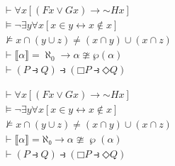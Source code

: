 \documentclass{article}
\begin{document}
\begin{align*}
  & \vdash \forall x [(Fx \vee Gx) \to \mathord{\sim} Hx] \\
  & \vDash \neg \exists y \forall x [x \in y \leftrightarrow x \notin x]  \\
  & \nvDash x \cap (y \cup z) \neq (x \cap y) \cup (x \cap z) \\
  & \vdash \lBrack\alpha\rBrack = \aleph_0 \to \alpha \ncong \wp(\alpha) \\
  & \vdash (P \rightfishtail Q) \rightfishtail
    (\mdlgwhtsquare P \rightfishtail \mdlgwhtdiamond Q)
\end{align*}

\begin{align*}
  & ⊢ ∀x [(Fx ∨ Gx) → \mathord{∼} Hx] \\
  & ⊨ ¬∃y∀x[x∈y ↔ x∉x]  \\
  & ⊭ x ∩ (y ∪ z) ≠ (x ∩ y) ∪ (x ∩ z) \\
  & ⊢ ⟦α⟧ = ℵ₀ → α ≇ ℘(α) \\
  & ⊢ (P ⥽ Q) ⥽ (□P ⥽ ◇Q)
\end{align*}
\end{document}
